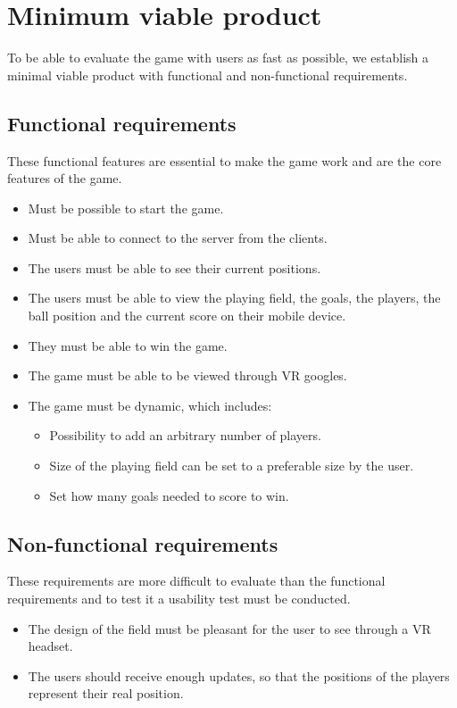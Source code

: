 \section{Minimum viable product}
To be able to evaluate the game with users as fast as possible, we establish a minimal viable product with functional and non-functional requirements.

\subsection{Functional requirements}
These functional features are essential to make the game work and are the core features of the game.

\begin{itemize}
    \item Must be possible to start the game.
    \item Must be able to connect to the server from the clients.
    \item The users must be able to see their current positions.
    \item The users must be able to view the playing field, the goals, the players, the ball position and the current score on their mobile device.
    \item They must be able to win the game.
    \item The game must be able to be viewed through VR googles.
    \item The game must be dynamic, which includes:
          \begin{itemize}
              \item Possibility to add an arbitrary number of players.
              \item Size of the playing field can be set to a preferable size by the user.
              \item Set how many goals needed to score to win.
          \end{itemize}
\end{itemize}

\subsection{Non-functional requirements}
These requirements are more difficult to evaluate than the functional requirements and to test it a usability test must be conducted.
\begin{itemize}
    \item The design of the field must be pleasant for the user to see through a VR headset.
    \item The users should receive enough updates, so that the positions of the players represent their real position.
\end{itemize}